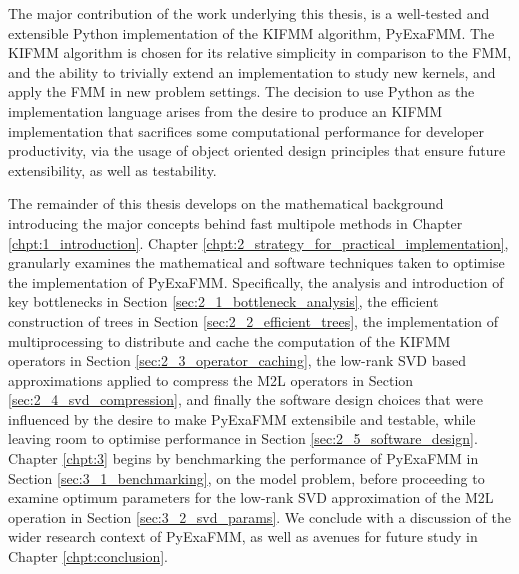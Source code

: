 The major contribution of the work underlying this thesis, is a well-tested and
extensible Python implementation of the \gls{KIFMM} algorithm, \gls{PyExaFMM}. The \gls{KIFMM}
algorithm is chosen for its relative simplicity in comparison to the \gls{FMM},
and the ability to trivially extend an implementation to study new kernels, and
apply the \gls{FMM} in new problem settings. The decision to use Python as the implementation language arises from the desire
to produce an \gls{KIFMM} implementation that sacrifices some computational
performance for developer productivity, via the usage of object oriented design
principles that ensure future extensibility, as well as testability.

The remainder of this thesis develops on the mathematical background introducing
the major concepts behind fast multipole methods in Chapter \ref{chpt:1_introduction}.
Chapter \ref{chpt:2_strategy_for_practical_implementation}, granularly examines
the mathematical and software techniques taken to optimise the implementation of
\gls{PyExaFMM}. Specifically, the analysis and introduction of key bottlenecks in Section \ref{sec:2_1_bottleneck_analysis},
the efficient construction of trees in Section \ref{sec:2_2_efficient_trees}, the implementation
of multiprocessing to distribute and cache the computation of the \gls{KIFMM}
operators in Section \ref{sec:2_3_operator_caching}, the low-rank SVD based
approximations applied to compress the \gls{M2L} operators in Section \ref{sec:2_4_svd_compression},
and finally the software design choices that were influenced by the desire to
make \gls{PyExaFMM} extensibile and testable, while leaving room to optimise
performance in Section \ref{sec:2_5_software_design}. Chapter \ref{chpt:3} begins
by benchmarking the performance of \gls{PyExaFMM} in Section \ref{sec:3_1_benchmarking},
on the model problem, before proceeding to examine optimum parameters for the
low-rank SVD approximation of the \gls{M2L} operation in Section \ref{sec:3_2_svd_params}.
We conclude with a discussion of the wider research context of \gls{PyExaFMM},
as well as avenues for future study in Chapter \ref{chpt:conclusion}.
